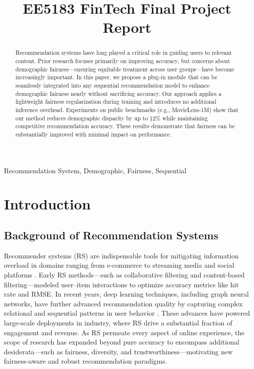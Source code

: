 \documentclass{article}
\title{EE5183 FinTech Final Project Report}
\begin{document}
%
\maketitle
%
\begin{abstract}
Recommendation systems have long played a critical role in guiding users to relevant content. Prior research focuses primarily on improving accuracy, but concerns about demographic fairness—ensuring equitable treatment across user groups—have become increasingly important. In this paper, we propose a plug-in module that can be seamlessly integrated into any sequential recommendation model to enhance demographic fairness nearly without sacrificing accuracy. Our approach applies a lightweight fairness regularization during training and introduces no additional inference overhead. Experiments on public benchmarks (e.g., MovieLens-1M) show that our method reduces demographic disparity by up to \b{12\%} while maintaining competitive recommendation accuracy. These results demonstrate that fairness can be substantially improved with minimal impact on performance.
\end{abstract}

%
\begin{keywords}
Recommendation System, Demographic, Fairness, Sequential
\end{keywords}
%
\section{Introduction}
\label{sec:intro}
\subsection{Background of Recommendation Systems}
Recommender systems (RS) are indispensable tools for mitigating information overload in domains ranging from e-commerce to streaming media and social platforms \cite{Wang2023FairRecSys}.  Early RS methods—such as collaborative filtering and content‐based filtering—modeled user–item interactions to optimize accuracy metrics like hit rate and RMSE.  In recent years, deep learning techniques, including graph neural networks, have further advanced recommendation quality by capturing complex relational and sequential patterns in user behavior \cite{Dong2022StructBiasGNN}.  These advances have powered large‐scale deployments in industry, where RS drive a substantial fraction of engagement and revenue.  As RS permeate every aspect of online experience, the scope of research has expanded beyond pure accuracy to encompass additional desiderata—such as fairness, diversity, and trustworthiness—motivating new fairness‐aware and robust recommendation paradigms.
\end{document}
